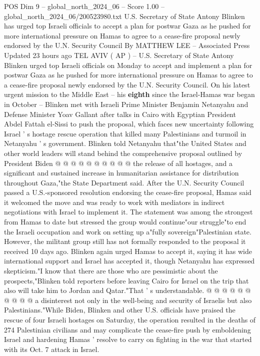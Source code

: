 \begin{textsample}{POS Dim 9 – global\_north\_2024\_06 – Score 1.00 – global\_north\_2024\_06/200523980.txt}  \label{ex:f9_pos_285}
U.S.
Secretary of State Antony Blinken has urged top Israeli officials to accept a plan for postwar Gaza as he pushed for more international pressure on Hamas to agree to a cease-fire proposal newly endorsed by the U.N.
Security Council By MATTHEW LEE -- Associated Press Updated 23 hours ago TEL AVIV ( AP ) -- U.S.
Secretary of State Antony Blinken urged top Israeli officials on Monday to accept and implement a plan for postwar Gaza as he pushed for more international pressure on Hamas to agree to a cease-fire proposal newly endorsed by the U.N.
Security Council.
On his latest urgent mission to the Middle East -- his \textbf{eighth} since the Israel-Hamas war began in October -- Blinken met with Israeli Prime Minister Benjamin Netanyahu and Defense Minister Yoav Gallant after talks in Cairo with Egyptian President Abdel Fattah el-Sissi to push the proposal, which faces new uncertainty following Israel ' s hostage rescue operation that killed many Palestinians and turmoil in Netanyahu ' s government.
Blinken told Netanyahu that"the United States and other world leaders will stand behind the comprehensive proposal outlined by President Biden @ @ @ @ @ @ @ @ @ @ the release of all hostages, and a significant and sustained increase in humanitarian assistance for distribution throughout Gaza,"the State Department said.
After the U.N.
Security Council passed a U.S.-sponsored resolution endorsing the cease-fire proposal, Hamas said it welcomed the move and was ready to work with mediators in indirect negotiations with Israel to implement it.
The statement was among the strongest from Hamas to date but stressed the group would continue"our struggle"to end the Israeli occupation and work on setting up a"fully sovereign"Palestinian state.
However, the militant group still has not formally responded to the proposal it received 10 days ago.
Blinken again urged Hamas to accept it, saying it has wide international support and Israel has accepted it, though Netanyahu has expressed skepticism."I know that there are those who are pessimistic about the prospects,"Blinken told reporters before leaving Cairo for Israel on the trip that also will take him to Jordan and Qatar."That ' s understandable. @ @ @ @ @ @ @ @ @ @ a disinterest not only in the well-being and security of Israelis but also Palestinians."While Biden, Blinken and other U.S. officials have praised the rescue of four Israeli hostages on Saturday, the operation resulted in the deaths of 274 Palestinian civilians and may complicate the cease-fire push by emboldening Israel and hardening Hamas ' resolve to carry on fighting in the war that started with its Oct. 7 attack in Israel.

\end{textsample}
